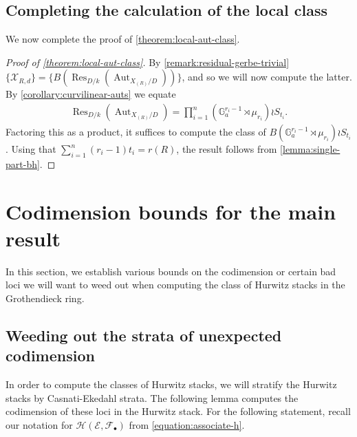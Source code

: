 \documentclass[12 pt]{amsart}
\theoremstyle{plain}
\theoremstyle{definition}
\theoremstyle{remark}
\numberwithin{equation}{section}
\newcommand\bg{\mathbb G}
\newcommand\sce{\mathscr E}
\newcommand\scf{\mathscr F}
\newcommand\sch{\mathscr H}
\newcommand\scx{\mathscr X}
\newcommand\gerbe[2]{\scx_{#1,#2}} %
\DeclareMathOperator\res{Res}
\DeclareMathOperator\aut{Aut}
\begin{document}
\subsection{Completing the calculation of the local class}
\label{subsection:local-class-proof}

We now complete the proof of \autoref{theorem:local-aut-class}.  

\begin{proof}[Proof of \autoref{theorem:local-aut-class}]
	By \autoref{remark:residual-gerbe-trivial}
	$\{\gerbe R d\} = \{B(\res_{D/k}(\aut_{X_{(R)}/D}))\}$,
	and so we will now compute the latter.
	By
\autoref{corollary:curvilinear-auts} we equate
\begin{align*}
	\res_{D/k}(\aut_{X_{(R)}/D}) = \prod_{i=1}^n \left( \bg_a^{r_i - 1} \rtimes
	\mu_{r_i} \right) \wr S_{t_i}.
\end{align*}
Factoring this as a product, it suffices to
compute the class of $B\left( \bg_a^{r_i - 1} \rtimes \mu_{r_i} \right) \wr
S_{t_i}$.  Using that $\sum_{i=1}^n (r_i-1)t_i =r(R)$, the result follows from
\autoref{lemma:single-part-bh}.  \end{proof}





\section{Codimension bounds for the main result}
\label{section:codimension-bounds}

In this section, we establish various bounds on the codimension or certain bad
loci we will want to weed out when computing the class of Hurwitz stacks in the
Grothendieck ring.

\subsection{Weeding out the strata of unexpected codimension} 
\label{subsection:codimension-of-strata}

In order to compute the classes of Hurwitz stacks, we will stratify the Hurwitz
stacks by Casnati-Ekedahl strata.
The following lemma computes the codimension of these loci in the Hurwitz stack.
For the following statement, recall our notation for $\sch(\sce, \scf_\bullet)$
from \eqref{equation:associate-h}.
\end{document}
